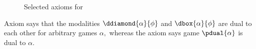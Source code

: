 \documentclass[12pt]{cmuthesis}
\theoremstyle{definition}
\theoremstyle{remark}
\begin{document}
\begin{figure}
  \centering
  \begin{calculuscollections}{\columnwidth}
    \begin{calculus}
\cinferenceRule[dglbox|{$[\cdot]$}]{}
{
\linferenceRule[equiv]{\dbox{\alpha}{\phi}}{\neg\ddiamond{\alpha}{\neg\phi}}
}{}
\cinferenceRule[dglassign|{$\langle:=\rangle$}]{}
{
}{}
{
}{}
{
}{}
{
\linferenceRule[equiv]{\ddiamond{\ptest{\psi}}{\phi}}{(\phi \land \psi)}
}{}
{
\linferenceRule[equiv]{\ddiamond{\alpha \cup \beta}{\phi}}{\ddiamond{\alpha}{\phi} \lor \ddiamond{\beta}{\phi}}
}{}
{
\linferenceRule[equiv]{\ddiamond{\alpha;\beta}{\phi}}{\ddiamond{\alpha}{\ddiamond{\beta}{\phi}}}
}{}
{
\linferenceRule[impl]{\phi\lor\ddiamond{\alpha}{\ddiamond{\prepeat{\alpha}}{\phi}}}{\ddiamond{\prepeat{\alpha}}{\phi}}
}{}
{
\linferenceRule[equiv]{\ddiamond{\pdual{\alpha}}{\phi}}{\neg\ddiamond{\alpha}{\neg\phi}}
}{}
\cinferenceRule[dglMon|M]{}
{
\linferenceRule[formula]{\phi\limply\psi}{\ddiamond{\alpha}{\phi}\limply\ddiamond{\alpha}{\psi}}
}{}
\cinferenceRule[dglfixpoint|FP]{}
{
\linferenceRule[formula]{\phi\lor\ddiamond{\alpha}{\psi} \limply \psi}{\ddiamond{\prepeat{\alpha}}{\phi} \to \psi}
}{}
    \end{calculus}
  \end{calculuscollections}
  \caption{Selected axioms for \dGL}
  \label{fig:dgl-axioms}
\end{figure}
Axiom  says that the modalities $\ddiamond{\alpha}{\phi}$ and $\dbox{\alpha}{\phi}$ are dual to each other for arbitrary games $\alpha,$ whereas the axiom  says game 
$\pdual{\alpha}$ is dual to $\alpha$.
\end{document}
